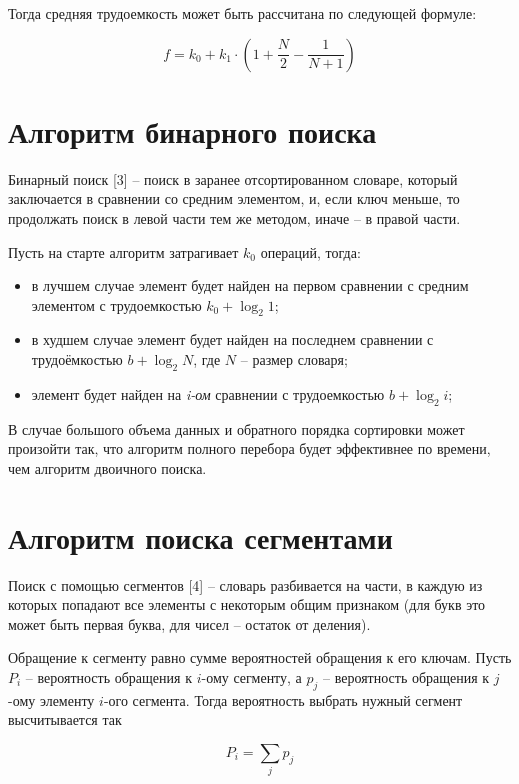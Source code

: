 \documentclass[a4paper,14pt, unknownkeysallowed]{extreport}
\begin{document}
Тогда средняя трудоемкость может быть рассчитана по следующей формуле:

\begin{equation}
	f = k_0 + k_1 \cdot \left(1 + \frac{N}{2} - \frac{1}{N + 1}\right)
\end{equation}

\section{Алгоритм бинарного поиска}


Бинарный поиск [3] -- поиск в заранее отсортированном словаре, который заключается в сравнении со средним элементом, и, если ключ меньше, то продолжать поиск в левой части тем же методом, иначе -- в правой части.

Пусть на старте алгоритм затрагивает $k_0$ операций, тогда:
\begin{itemize}
	\item в лучшем случае элемент будет найден на первом сравнении с средним элементом с трудоемкостью $k_0 + \log_2 1$;
	\item в худшем случае элемент будет найден на последнем сравнении с трудоёмкостью $b +  \log_2 N$, где $N$ -- размер словаря;
	\item элемент будет найден на \textit{i-ом} сравнении с трудоемкостью $b + \log_2 i$;
\end{itemize}

В случае большого объема данных и обратного порядка сортировки может произойти так, что алгоритм полного перебора будет эффективнее по времени, чем алгоритм двоичного поиска.

\clearpage

\section{Алгоритм поиска сегментами}

Поиск с помощью сегментов [4] -- словарь разбивается на части, в каждую из которых попадают все элементы с некоторым общим признаком (для букв это может быть первая буква, для чисел -- остаток от деления).

Обращение к сегменту равно сумме вероятностей обращения к его ключам. Пусть $P_i$ -- вероятность обращения к $i$-ому сегменту, а $p_j$ -- вероятность обращения к $j$-ому элементу $i$-ого сегмента. Тогда вероятность выбрать нужный сегмент высчитывается так 

\begin{equation}
	P_i = \sum_j p_j
\end{equation}
\end{document}
